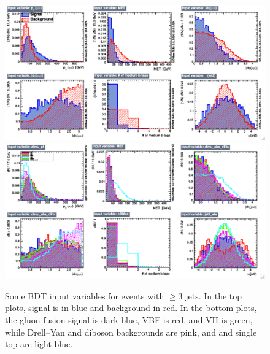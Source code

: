 \begin{figure}
  \includegraphics[width=1.0\linewidth]{figures/bdt_training/BDT_in_ge3j_all_A.pdf}
  \includegraphics[width=1.0\linewidth]{figures/bdt_training/BDT_in_ge3j_sep_A.pdf}
  \caption{Some BDT input variables for events with $\ge 3$ jets.
           In the top plots, signal is in blue and background in red.
           In the bottom plots, the gluon-fusion signal is dark blue, VBF is red, and VH is green,
           while Drell--Yan and diboson backgrounds are pink, and \ttbar and single top are light blue.}
  \label{fig:BDT_in_ge3j_A}
\end{figure}

